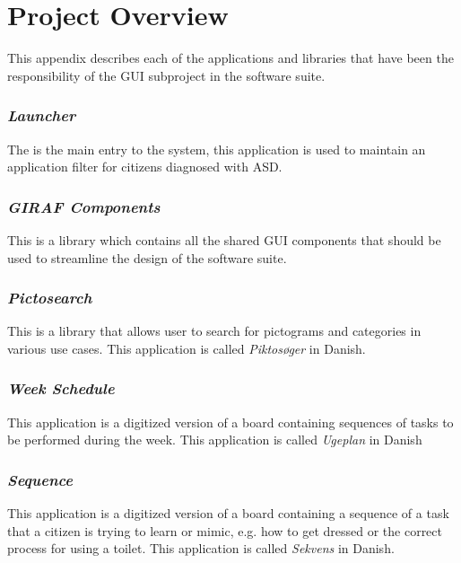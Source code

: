 \chapter{Project Overview} %
\label{cha:project_overview}

This appendix describes each of the applications and libraries that have been the responsibility of the GUI subproject in the \giraf software suite. 

\subsection*{\emph{Launcher}}
\label{sec:app_launcher}
The \launcher is the main entry to the system, this application is used to maintain an application filter for citizens diagnosed with ASD.

\subsection*{\emph{GIRAF Components}}
\label{sec:app_giraf_components}
This is a library which contains all the shared GUI components that should be used to streamline the design of the \giraf software suite.

\subsection*{\emph{Pictosearch}}
\label{sec:app_pictosearch}
This is a library that allows user to search for pictograms and categories in various use cases. This application is called \emph{Piktosøger} in Danish.

\subsection*{\emph{Week Schedule}}
\label{sec:app_week_schedule}
This application is a digitized version of a board containing sequences of tasks to be performed during the week. This application is called \emph{Ugeplan} in Danish 

\subsection*{\emph{Sequence}}
\label{sec:app_sequence}
This application is a digitized version of a board containing a sequence of a task that a citizen is trying to learn or mimic, e.g. how to get dressed or the correct process for using a toilet. This application is called \emph{Sekvens} in Danish.

